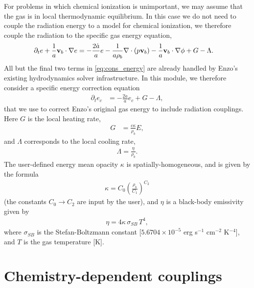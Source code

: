 \documentclass[letterpaper,10pt]{article}
\renewcommand{\(}{\left(}
\renewcommand{\)}{\right)}
\newcommand{\vb}{{\bf v}_b}
\newcommand{\rhob}{\rho_b}
\begin{document}
For problems in which chemical ionization is unimportant, we may
assume that the gas is in local thermodynamic equilibrium.  In this
case we do not need to couple the radiation energy to a model for
chemical ionization, we therefore couple the radiation to the specific
gas energy equation, 
\begin{align}
  \label{eq:cons_energy}
  \partial_t e + \frac1a\vb\cdot\nabla e &=
    - \frac{2\dot{a}}{a}e
    - \frac{1}{a\rhob}\nabla\cdot\left(p\vb\right) 
    - \frac1a\vb\cdot\nabla\phi + G - \Lambda.
\end{align}
All but the final two terms in \eqref{eq:cons_energy} are already
handled by Enzo's existing hydrodynamics solver infrastructure.  In
this module, we therefore consider a specific energy correction equation 
\begin{align}
  \label{eq:cons_energy_correction}
  \partial_t e_c &= -\frac{2\dot{a}}{a}e_c + G - \Lambda,
\end{align}
that we use to correct Enzo's original gas energy to include radiation
couplings.  Here $G$ is the local heating rate,
\begin{align}
\label{eq:G_LTE}
  G &= \frac{c \kappa}{\rhob} E,
\end{align}
and $\Lambda$ corresponds to the local cooling rate,
\begin{align}
\label{eq:Lambda_LTE}
  \Lambda = \frac{\eta}{\rhob} .
\end{align}
The user-defined energy mean opacity $\kappa$ is
spatially-homogeneous, and is given by the formula
\begin{align}
\label{eq:opacityE}
  \kappa = C_0 \left(\frac{\rhob}{C_1}\right)^{C_2}
\end{align}
(the constants $C_0\to C_2$ are input by the user), and $\eta$ is
a black-body emissivity given by 
\begin{align}
\label{eq:etaBB}
  \eta = 4\kappa\,\sigma_{SB}\,T^4,
\end{align}
where $\sigma_{SB}$ is the Stefan-Boltzmann constant [$5.6704\times
10^{-5}$ erg s$^{-1}$ cm$^{-2}$ K$^{-4}$], and $T$ is the gas
temperature [K]. 



\section{Chemistry-dependent couplings}
\label{sec:chem_model}
\end{document}
